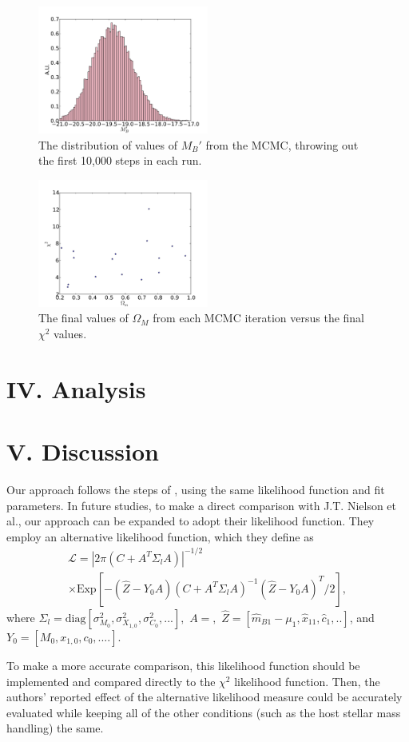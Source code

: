 \documentclass[aps,prl,reprint]{revtex4-1}
\begin{document}
\begin{figure}
 \includegraphics[width=0.5\textwidth]{../plots/Mp_hist.pdf}
\caption{\label{fig:Mphist}The distribution of values of $M_B'$ from the MCMC, throwing out the first 10,000 steps in each run.}
\end{figure}
\begin{figure}
 \includegraphics[width=0.5\textwidth]{../plots/om_chi.pdf}
\caption{\label{fig:chi2}The final values of $\Omega_M$ from each MCMC iteration versus the final $\chi^2$ values.}
\end{figure}
\section{IV. Analysis} 
\section{V. Discussion}
Our approach follows the steps of \cite{sdss}, using the same likelihood function and fit parameters. In future studies, to make a direct comparison with J.T. Nielson et al., our approach can be expanded to adopt their likelihood function. 
They employ an alternative likelihood function, which they define as \begin{align*}\mathscr{L} = |2\pi(C+A^T \Sigma_l A)|^{-1/2}\; \\
\times \text{Exp}[-(\hat{Z}-Y_0A)(C+A^T\Sigma_lA)^{-1}(\hat{Z}-Y_0A)^T/2],\end{align*} where $\Sigma_l = \text{diag}[\sigma_{M_0}^2,\sigma_{X_{1,0}}^2,\sigma_{C_0}^2,...],$ $A = ,$ $\hat{Z} = [\hat{m}_{B1}-\mu_1, \hat{x}_{11},\hat{c}_1,..]$, and $Y_0 = [M_0,x_{1,0},c_0,....]$. 
\par To make a more accurate comparison, this likelihood function should be implemented and compared directly to the $\chi^2$ likelihood function. Then, the authors' reported effect of the alternative likelihood measure could be accurately evaluated while keeping all of the other conditions (such as the host stellar mass handling) the same. 


 
 
\end{document}
